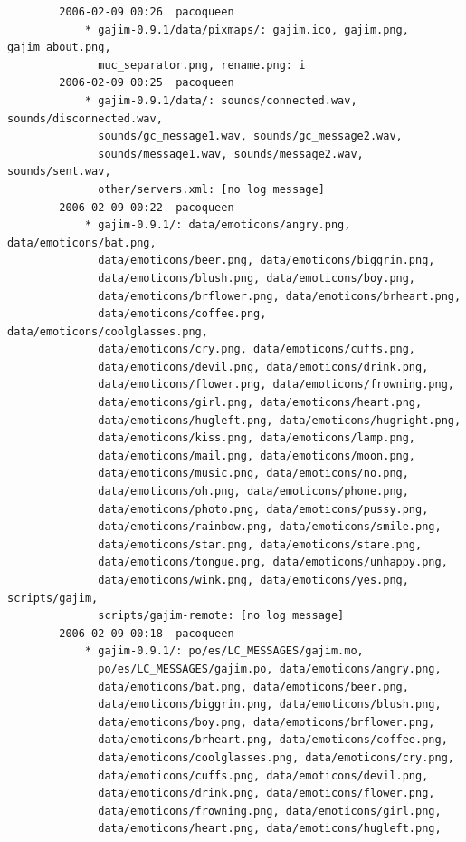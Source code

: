 \documentclass[a4paper]{article}
\begin{document}
\begin{verbatim}
        2006-02-09 00:26  pacoqueen
            * gajim-0.9.1/data/pixmaps/: gajim.ico, gajim.png, gajim_about.png,
              muc_separator.png, rename.png: i
        2006-02-09 00:25  pacoqueen
            * gajim-0.9.1/data/: sounds/connected.wav, sounds/disconnected.wav,
              sounds/gc_message1.wav, sounds/gc_message2.wav,
              sounds/message1.wav, sounds/message2.wav, sounds/sent.wav,
              other/servers.xml: [no log message]
        2006-02-09 00:22  pacoqueen
            * gajim-0.9.1/: data/emoticons/angry.png, data/emoticons/bat.png,
              data/emoticons/beer.png, data/emoticons/biggrin.png,
              data/emoticons/blush.png, data/emoticons/boy.png,
              data/emoticons/brflower.png, data/emoticons/brheart.png,
              data/emoticons/coffee.png, data/emoticons/coolglasses.png,
              data/emoticons/cry.png, data/emoticons/cuffs.png,
              data/emoticons/devil.png, data/emoticons/drink.png,
              data/emoticons/flower.png, data/emoticons/frowning.png,
              data/emoticons/girl.png, data/emoticons/heart.png,
              data/emoticons/hugleft.png, data/emoticons/hugright.png,
              data/emoticons/kiss.png, data/emoticons/lamp.png,
              data/emoticons/mail.png, data/emoticons/moon.png,
              data/emoticons/music.png, data/emoticons/no.png,
              data/emoticons/oh.png, data/emoticons/phone.png,
              data/emoticons/photo.png, data/emoticons/pussy.png,
              data/emoticons/rainbow.png, data/emoticons/smile.png,
              data/emoticons/star.png, data/emoticons/stare.png,
              data/emoticons/tongue.png, data/emoticons/unhappy.png,
              data/emoticons/wink.png, data/emoticons/yes.png, scripts/gajim,
              scripts/gajim-remote: [no log message]
        2006-02-09 00:18  pacoqueen
            * gajim-0.9.1/: po/es/LC_MESSAGES/gajim.mo,
              po/es/LC_MESSAGES/gajim.po, data/emoticons/angry.png,
              data/emoticons/bat.png, data/emoticons/beer.png,
              data/emoticons/biggrin.png, data/emoticons/blush.png,
              data/emoticons/boy.png, data/emoticons/brflower.png,
              data/emoticons/brheart.png, data/emoticons/coffee.png,
              data/emoticons/coolglasses.png, data/emoticons/cry.png,
              data/emoticons/cuffs.png, data/emoticons/devil.png,
              data/emoticons/drink.png, data/emoticons/flower.png,
              data/emoticons/frowning.png, data/emoticons/girl.png,
              data/emoticons/heart.png, data/emoticons/hugleft.png,

\end{verbatim}
\end{document}
